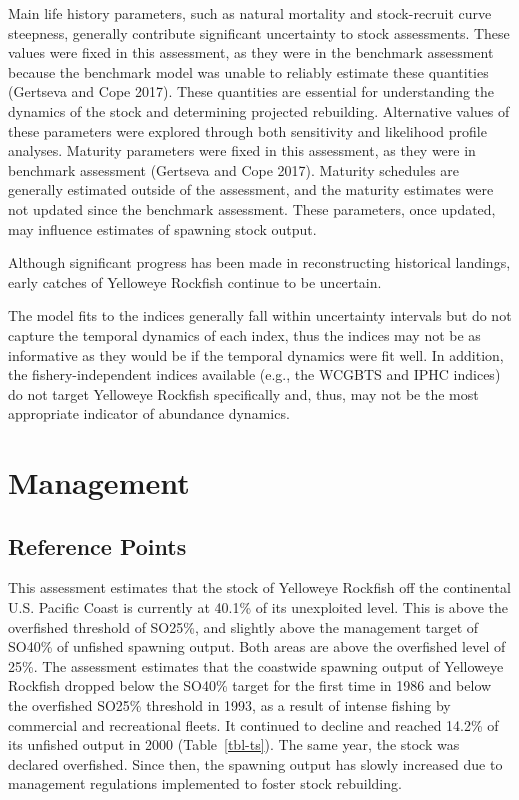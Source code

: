 \documentclass[
]{scrartcl}
\begin{document}
Main life history parameters, such as natural mortality and
stock-recruit curve steepness, generally contribute significant
uncertainty to stock assessments. These values were fixed in this
assessment, as they were in the benchmark assessment because the
benchmark model was unable to reliably estimate these quantities
(Gertseva and Cope 2017). These quantities are essential for
understanding the dynamics of the stock and determining projected
rebuilding. Alternative values of these parameters were explored through
both sensitivity and likelihood profile analyses. Maturity parameters
were fixed in this assessment, as they were in benchmark assessment
(Gertseva and Cope 2017). Maturity schedules are generally estimated
outside of the assessment, and the maturity estimates were not updated
since the benchmark assessment. These parameters, once updated, may
influence estimates of spawning stock output.

Although significant progress has been made in reconstructing historical
landings, early catches of Yelloweye Rockfish continue to be uncertain.

The model fits to the indices generally fall within uncertainty
intervals but do not capture the temporal dynamics of each index, thus
the indices may not be as informative as they would be if the temporal
dynamics were fit well. In addition, the fishery-independent indices
available (e.g., the WCGBTS and IPHC indices) do not target Yelloweye
Rockfish specifically and, thus, may not be the most appropriate
indicator of abundance dynamics.

\newpage{}

\section{Management}\label{management}

\subsection{Reference Points}\label{reference-points-1}

This assessment estimates that the stock of Yelloweye Rockfish off the
continental U.S. Pacific Coast is currently at 40.1\% of its unexploited
level. This is above the overfished threshold of SO25\%, and slightly
above the management target of SO40\% of unfished spawning output. Both
areas are above the overfished level of 25\%. The assessment estimates
that the coastwide spawning output of Yelloweye Rockfish dropped below
the SO40\% target for the first time in 1986 and below the overfished
SO25\% threshold in 1993, as a result of intense fishing by commercial
and recreational fleets. It continued to decline and reached 14.2\% of
its unfished output in 2000 (Table~\ref{tbl-ts}). The same year, the
stock was declared overfished. Since then, the spawning output has
slowly increased due to management regulations implemented to foster
stock rebuilding.
\end{document}
